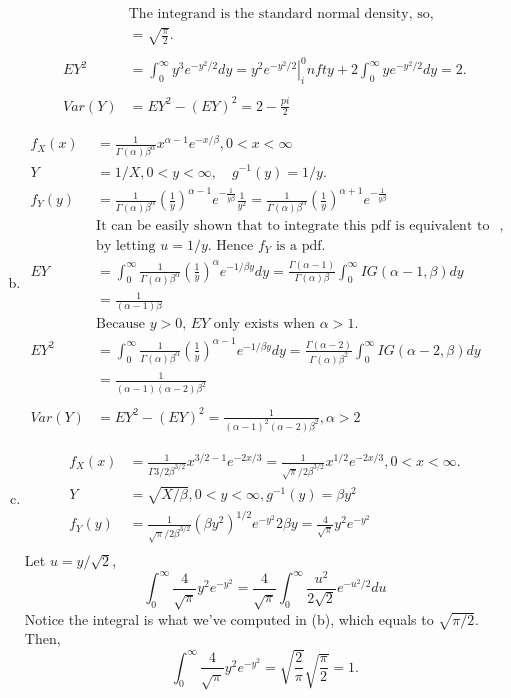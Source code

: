 \documentclass[letter]{article}
\newcommand{\Gal}{\Gamma(\alpha)}
\newcommand{\Iy}{\frac{1}{y}}
\newcommand{\Beal}{\beta^\alpha}
\newcommand{\intzi}{\int_0^\infty}
\begin{document}
\begin{enumerate}[(a)]
\begin{align*}
    & \text{The integrand is the standard normal density, so},\\
    & = \sqrt{\frac{\pi}{2}}.\\
    \\
    EY^2 & = \intzi y^3 e^{-y^2/2} dy = \left. y^2 e^{-y^2/2} \right|^0_infty + 2 \intzi ye^{-y^2/2} dy = 2.\\
    \\
    Var(Y) & = EY^2 - (EY)^2 = 2-\frac{pi}{2}
    \end{align*}
    \item 
    \begin{align*}
    f_X(x) & = \frac{1}{\Gal \Beal} x^{\alpha-1} e^{-x/\beta}, 0 < x < \infty \\
    Y & = 1/X, 0 < y < \infty, \quad g^{-1}(y) = 1/y.\\
    f_Y(y) & = \frac{1}{\Gal \Beal} (\frac{1}{y})^{\alpha-1} e^{-\frac{1}{y\beta}} \frac{1}{y^2} = 
    \frac{1}{\Gal \Beal} (\frac{1}{y})^{\alpha+1} e^{-\frac{1}{y\beta}} \\
    & \text{It can be easily shown that to integrate this pdf is equivalent to integrate a gamma density},\\
    & \text{by letting $u = 1/y$. Hence $f_Y$ is a pdf}.\\ 
    EY & = \intzi \frac{1}{\Gal \Beal} (\Iy)^\alpha e^{-1/\beta y} dy = \frac{\Gamma(\alpha-1)}{\Gal \beta} \intzi IG(\alpha-1, \beta) dy \\
    & = \frac{1}{(\alpha-1)\beta} \\
    & \text{Because $y > 0$, $EY$ only exists when $\alpha > 1$.}\\
    EY^2 & = \intzi \frac{1}{\Gal \Beal} (\Iy)^{\alpha-1} e^{-1/\beta y} dy = \frac{\Gamma(\alpha-2)}{\Gal \beta^2} \intzi IG(\alpha-2, \beta) dy \\
    & = \frac{1}{(\alpha-1)(\alpha-2)\beta^2}\\
    \\
    Var(Y) & = EY^2 - (EY)^2 = \frac{1}{(\alpha-1)^2(\alpha-2)\beta^2}, \alpha > 2
    \end{align*}
    \item
    \begin{align*}
    f_X(x) & = \frac{1}{\Gamma{3/2}\beta^{3/2}} x^{3/2-1} e^{-2x/3} = \frac{1}{\sqrt{\pi}/2 \beta^{3/2}} x^{1/2} e^{-2x/3}, 0 < x < \infty.\\
    Y & = \sqrt{X/\beta}, 0 < y < \infty, g^{-1}(y) = \beta y^2 \\
    f_Y(y) & = \frac{1}{\sqrt{\pi}/2 \beta^{3/2}} (\beta y^2)^{1/2} e^{-y^2} 2\beta y = \frac{4}{\sqrt{\pi}} y^2 e^{-y^2}\\
    \end{align*}
    Let $u = y/\sqrt{2}$,
    \[
    \intzi \frac{4}{\sqrt{\pi}} y^2 e^{-y^2}  = \frac{4}{\sqrt{\pi}} \intzi \frac{u^2}{2\sqrt{2}} e^{-u^2/2}du
    \]
    Notice the integral is what we've computed in (b), which equals to $\sqrt{\pi/2}$. Then,
    \[
    \intzi \frac{4}{\sqrt{\pi}} y^2 e^{-y^2} = \sqrt{\frac{2}{\pi}} \sqrt{\frac{\pi}{2}} = 1.
    \]


\end{enumerate}
\end{document}
